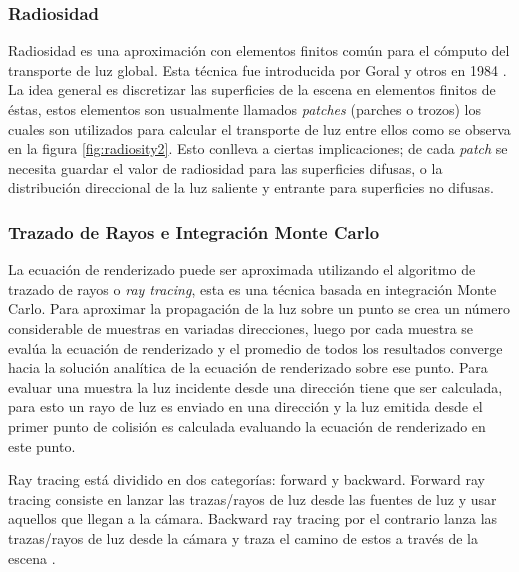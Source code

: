 \subsubsection{Radiosidad}
\label{subsec:radiosity}

Radiosidad es una aproximación con elementos finitos común para el cómputo del transporte de luz global. Esta técnica fue introducida por Goral y otros en 1984 \cite{goral84}. La idea general es discretizar las superficies de la escena en elementos finitos de éstas, estos elementos son usualmente llamados \emph{patches} (parches o trozos) los cuales son utilizados para calcular el transporte de luz entre ellos como se observa en la figura \ref{fig:radiosity2}. Esto conlleva a ciertas implicaciones; de cada \emph{patch} se necesita guardar el valor de radiosidad para las superficies difusas, o la distribución direccional de la luz saliente y entrante para superficies no difusas.

\subsubsection{Trazado de Rayos e Integración Monte Carlo}
\label{subsec:monte_carlo_raytracing}
La ecuación de renderizado puede ser aproximada utilizando el algoritmo de trazado de rayos o \emph{ray tracing}, esta es una técnica basada en integración Monte Carlo. Para aproximar la propagación de la luz sobre un punto se crea un número considerable de muestras en variadas direcciones, luego por cada muestra se evalúa la ecuación de renderizado y el promedio de todos los resultados converge hacia la solución analítica de la ecuación de renderizado sobre ese punto. Para evaluar una muestra la luz incidente desde una dirección tiene que ser calculada, para esto un rayo de luz es enviado en una dirección y la luz emitida desde el primer punto de colisión es calculada evaluando la ecuación de renderizado en este punto.

Ray tracing está dividido en dos categorías: forward y backward. Forward ray tracing consiste en lanzar las trazas/rayos de luz desde las fuentes de luz y usar aquellos que llegan a la cámara. Backward ray tracing por el contrario lanza las trazas/rayos de luz desde la cámara y traza el camino de estos a través de la escena \cite{Arvo86backwardray}.

